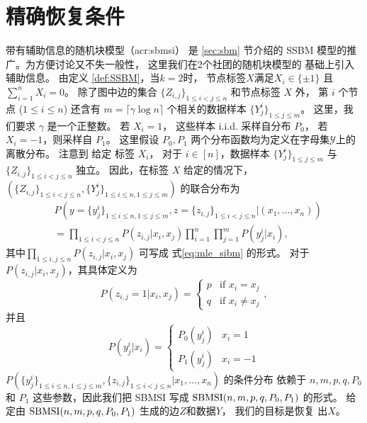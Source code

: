 \section{精确恢复条件}\label{sec:sbmsi_exact_recovery_condition}
带有辅助信息的随机块模型（\gls{acr:sbmsi}）
是 \ref{sec:sbm} 节介绍的
SSBM 模型的推广。为方便讨论又不失一般性，
这里我们在2个社团的随机块模型的
基础上引入辅助信息。
由定义 \ref{def:SSBM}，当$k=2$时，
节点标签$X$满足$X_i \in \{\pm 1\}$
且 $\sum_{i=1}^n X_i = 0$。
除了图中边的集合
$\{Z_{i,j}\}_{1\le i<j\le n}$
和节点标签 $X$ 外，
第 $i$  个节点 ($1\leq i \leq n$) 
还含有 $m=\lceil \gamma \log n \rceil $ 个相关的数据样本 
$\{Y^{i}_j\}_{1\leq j \leq m}$。
这里，我们要求 $\gamma$ 是一个正整数。
若 $X_i=1$，
这些样本 i.i.d. 采样自分布 $P_0$，
若 $X_i=-1$，则采样自 $P_1$。
这里假设 $P_0, P_1$ 两个分布函数均为定义在字母集$\mathcal{Y}$上的离散分布。
注意到 给定 标签 $X_i$，
对于 $i\in [n]$，数据样本 $\{Y^{i}_j\}_{1\leq j \leq m}$ 与 $\{Z_{i,j}\}_{1\le i<j\le n}$ 独立。
 因此，在标签 $X$ 给定的情况下，
  $(\{Z_{i,j}\}_{1\le i<j\le n},\{Y^i_{j}\}_{1\le i\le n,1\le j\le m})$ 的联合分布为  
\begin{align}\label{eq:lh}
    &P(y=\{y^i_{j}\}_{1\le i\le n,1\le j\le m},z=\{z_{i,j}\}_{1\le i<j\le n}| (x_1,\ldots,x_n)) \nonumber\\
    &= \prod_{1\le i < j\le n}P(z_{i,j}|x_i,x_j)\prod_{i=1}^n \prod_{j=1}^m P(y^i_j|x_i), 
\end{align}
其中$\prod_{1\le i,j\le n}P(z_{i,j}|x_i,x_j)$ 可写成
式\eqref{eq:mle_sibm} 的形式。
对于$P(z_{i,j}|x_i,x_j)$，其具体定义为
\begin{equation*}
    P  (z_{i,j}=1|x_i,x_j) = \begin{cases}
        p & \text{if } x_i = x_j \\
        q & \text{if } x_i\ne x_j
    \end{cases},
\end{equation*}
并且
\begin{equation*}
    P(y^i_j|x_i) = \begin{cases}
        P_0(y^i_j) & x_i = 1 \\
        P_1(y^i_j) & x_i = -1
    \end{cases}
\end{equation*}
 $P(\{y^i_{j}\}_{1\le i\le n,1\le j\le m},\{z_{i,j}\}_{1\le i<j\le n}| x_1,\ldots,x_n)$ 
 的条件分布 依赖于
 $n,m,p, q, P_0$ 和 $P_1$ 这些参数，因此我们把 SBMSI 写成 $\operatorname{SBMSI}(n,m,p,q,P_0,P_1)$ 的形式。
 给定由 $\operatorname{SBMSI}(n,m,p,q,P_0,P_1)$ 生成的边$Z$和数据$Y$， 我们的目标是恢复 出$X$。
 
